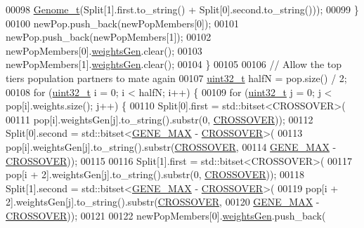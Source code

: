 \begin{DoxyCode}
00098           \hyperlink{_soil_math_types_8h_a58f6ab36d2cb0527a73caec36d14a0e0}{Genome\_t}(Split[1].first.to\_string() + Split[0].second.to\_string()));
00099     \}
00100     newPop.push\_back(newPopMembers[0]);
00101     newPop.push\_back(newPopMembers[1]);
00102     newPopMembers[0].\hyperlink{struct_pop_member_struct_a072fadb4863e0cf77b55ad3b46b62522}{weightsGen}.clear();
00103     newPopMembers[1].\hyperlink{struct_pop_member_struct_a072fadb4863e0cf77b55ad3b46b62522}{weightsGen}.clear();
00104   \}
00105 
00106   \textcolor{comment}{// Allow the top tiers population partners to mate again}
00107   \hyperlink{_soil_math_types_8h_a435d1572bf3f880d55459d9805097f62}{uint32\_t} halfN = pop.size() / 2;
00108   \textcolor{keywordflow}{for} (\hyperlink{_soil_math_types_8h_a435d1572bf3f880d55459d9805097f62}{uint32\_t} i = 0; i < halfN; i++) \{
00109     \textcolor{keywordflow}{for} (\hyperlink{_soil_math_types_8h_a435d1572bf3f880d55459d9805097f62}{uint32\_t} j = 0; j < pop[i].weights.size(); j++) \{
00110       Split[0].first = std::bitset<CROSSOVER>(
00111           pop[i].weightsGen[j].to\_string().substr(0, \hyperlink{_soil_math_types_8h_ae84e527452fcf9dfc8ef8fd0dd5cd598}{CROSSOVER}));
00112       Split[0].second = std::bitset<\hyperlink{_soil_math_types_8h_aa5e1eb1a998e5ed69af2076cf318df4b}{GENE\_MAX} - \hyperlink{_soil_math_types_8h_ae84e527452fcf9dfc8ef8fd0dd5cd598}{CROSSOVER}>(
00113           pop[i].weightsGen[j].to\_string().substr(\hyperlink{_soil_math_types_8h_ae84e527452fcf9dfc8ef8fd0dd5cd598}{CROSSOVER},
00114                                                   \hyperlink{_soil_math_types_8h_aa5e1eb1a998e5ed69af2076cf318df4b}{GENE\_MAX} - \hyperlink{_soil_math_types_8h_ae84e527452fcf9dfc8ef8fd0dd5cd598}{CROSSOVER}));
00115 
00116       Split[1].first = std::bitset<CROSSOVER>(
00117           pop[i + 2].weightsGen[j].to\_string().substr(0, \hyperlink{_soil_math_types_8h_ae84e527452fcf9dfc8ef8fd0dd5cd598}{CROSSOVER}));
00118       Split[1].second = std::bitset<\hyperlink{_soil_math_types_8h_aa5e1eb1a998e5ed69af2076cf318df4b}{GENE\_MAX} - \hyperlink{_soil_math_types_8h_ae84e527452fcf9dfc8ef8fd0dd5cd598}{CROSSOVER}>(
00119           pop[i + 2].weightsGen[j].to\_string().substr(\hyperlink{_soil_math_types_8h_ae84e527452fcf9dfc8ef8fd0dd5cd598}{CROSSOVER},
00120                                                       \hyperlink{_soil_math_types_8h_aa5e1eb1a998e5ed69af2076cf318df4b}{GENE\_MAX} - 
      \hyperlink{_soil_math_types_8h_ae84e527452fcf9dfc8ef8fd0dd5cd598}{CROSSOVER}));
00121 
00122       newPopMembers[0].\hyperlink{struct_pop_member_struct_a072fadb4863e0cf77b55ad3b46b62522}{weightsGen}.push\_back(

\end{DoxyCode}

